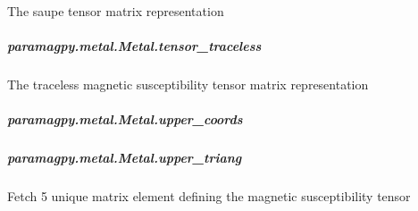 \documentclass[a4paper,10pt,english]{sphinxmanual}
\begin{document}
\begin{fulllineitems}
\begin{fulllineitems}
\begin{fulllineitems}
\label{\detokenize{reference/generated/paramagpy.metal.Metal.tensor_saupe:paramagpy.metal.Metal.tensor_saupe}}
The saupe tensor matrix representation

\end{fulllineitems}



\subparagraph{paramagpy.metal.Metal.tensor\_traceless}
\label{\detokenize{reference/generated/paramagpy.metal.Metal.tensor_traceless:paramagpy-metal-metal-tensor-traceless}}\label{\detokenize{reference/generated/paramagpy.metal.Metal.tensor_traceless::doc}}

\begin{fulllineitems}
\label{\detokenize{reference/generated/paramagpy.metal.Metal.tensor_traceless:paramagpy.metal.Metal.tensor_traceless}}
The traceless magnetic susceptibility tensor matrix representation

\end{fulllineitems}



\subparagraph{paramagpy.metal.Metal.upper\_coords}
\label{\detokenize{reference/generated/paramagpy.metal.Metal.upper_coords:paramagpy-metal-metal-upper-coords}}\label{\detokenize{reference/generated/paramagpy.metal.Metal.upper_coords::doc}}

\begin{fulllineitems}
\label{\detokenize{reference/generated/paramagpy.metal.Metal.upper_coords:paramagpy.metal.Metal.upper_coords}}
\end{fulllineitems}



\subparagraph{paramagpy.metal.Metal.upper\_triang}
\label{\detokenize{reference/generated/paramagpy.metal.Metal.upper_triang:paramagpy-metal-metal-upper-triang}}\label{\detokenize{reference/generated/paramagpy.metal.Metal.upper_triang::doc}}

\begin{fulllineitems}
\label{\detokenize{reference/generated/paramagpy.metal.Metal.upper_triang:paramagpy.metal.Metal.upper_triang}}
Fetch 5 unique matrix element defining the magnetic
susceptibility tensor


\end{fulllineitems}
\end{fulllineitems}
\end{fulllineitems}
\end{document}
